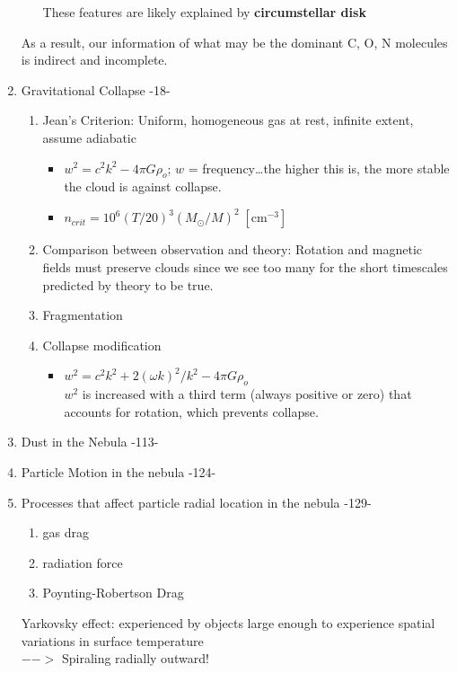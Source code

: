 \documentclass[12pt]{article}
\begin{document}
\begin{enumerate}
\begin{enumerate}
\begin{itemize}
                \end{itemize}
                These features are likely explained by \textbf{circumstellar disk}
        \end{enumerate}
        As a result, our information of what may be the dominant C, O, N
        molecules is indirect and incomplete.
    \item Gravitational Collapse -18-
        \begin{enumerate}
            \item Jean's Criterion: Uniform, homogeneous gas at rest,
                infinite extent, assume adiabatic
                \begin{itemize}
                    \item $w^2 = c^2k^2 - 4\pi G\rho_o$;
                        $w$ = frequency\ldots the higher this is, the more stable the
                        cloud is against collapse.
                    \item $n_{crit} = 10^{6}(T/20)^{3}(M_{\odot}/M)^{2}\;[\mathrm{cm}^{-3}]$
                \end{itemize}
            \item Comparison between observation and theory:
                Rotation and magnetic fields must preserve clouds since we see
                too many for the short timescales predicted by theory to be
                true.
        \item Fragmentation
        \item Collapse modification
        \begin{itemize}
            \item $w^2 = c^2k^2 + 2({\omega}k)^2/k^2  - 4\pi G\rho_o$
            \\
            $w^2$ is increased with a third term (always positive or
            zero) that accounts for
            rotation, which prevents collapse. 
        \end{itemize}
    \end{enumerate}

    \item Dust in the Nebula -113-
    \item Particle Motion in the nebula -124-
    \item Processes that affect particle radial location in the nebula
    -129-
    \begin{enumerate}
      \item gas drag
      \item radiation force
      \item Poynting-Robertson Drag
    \end{enumerate}
    Yarkovsky effect: experienced by objects large enough to
    experience spatial variations in surface temperature \\
    $-->$ Spiraling radially outward!


\end{enumerate}
\end{document}
